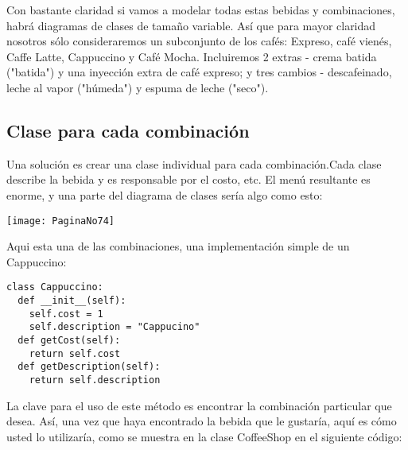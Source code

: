 Con bastante claridad si vamos a modelar todas estas bebidas y combinaciones, habrá diagramas de clases de tamaño variable. Así que para mayor claridad nosotros sólo consideraremos un subconjunto de los cafés: Expreso, café vienés, Caffe Latte,
Cappuccino y Café Mocha. 
Incluiremos 2 extras - crema batida ("batida") y una inyección extra de café expreso; y tres cambios - descafeinado, leche al vapor ("húmeda") y espuma de leche ("seco").   \newline

\subsection*{Clase para cada combinación}
\label{subsec:cpcc}

Una solución es crear una clase individual  para cada combinación.Cada clase describe la bebida y es responsable por el costo, etc. El menú resultante es enorme, y una parte del diagrama de clases sería algo como esto:    \newline

\texttt{[image: PaginaNo74]} 

Aqui esta una de las combinaciones, una implementación simple de un Cappuccino:     \newline

\begin{lstlisting} 
class Cappuccino: 
  def __init__(self): 
    self.cost = 1 
    self.description = "Cappucino" 
  def getCost(self): 
    return self.cost 
  def getDescription(self): 
    return self.description 
\end{lstlisting}

La clave para el uso de este método es encontrar la combinación particular que desea. Así, una vez que haya encontrado la bebida que le gustaría, aquí es cómo usted lo utilizaría, como se muestra en la clase CoffeeShop en el siguiente código:     \newline

